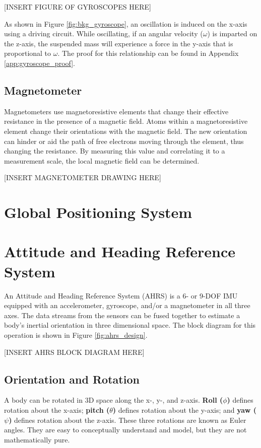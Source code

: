 [INSERT FIGURE OF GYROSCOPES HERE]

As shown in Figure \ref{fig:bkg_gyroscope}, an oscillation is induced on the x-axis using a driving circuit.
While oscillating, if an angular velocity ($\omega$) is imparted on the z-axis, the suspended mass will experience a force in the y-axis that is proportional to $\omega$.
The proof for this relationship can be found in Appendix \ref{app:gyroscope_proof}.

\subsection{Magnetometer} \label{ssec:bkg_magnetometer}
Magnetometers use magnetoresistive elements that change their effective resistance in the presence of a magnetic field.
Atoms within a magnetoresistive element change their orientations with the magnetic field.
The new orientation can hinder or aid the path of free electrons moving through the element, thus changing the resistance.
By measuring this value and correlating it to a measurement scale, the local magnetic field can be determined.

[INSERT MAGNETOMETER DRAWING HERE]

\section{Global Positioning System} \label{sec:bkg_gps}

\section{Attitude and Heading Reference System} \label{sec:bkg_ahrs}
An Attitude and Heading Reference System (AHRS) is a 6- or 9-DOF IMU equipped with an accelerometer, gyroscope, and/or a magnetometer in all three axes.
The data streams from the sensors can be fused together to estimate a body's inertial orientation in three dimensional space.
The block diagram for this operation is shown in Figure \ref{fig:ahrs_design}.

[INSERT AHRS BLOCK DIAGRAM HERE]

\subsection{Orientation and Rotation} \label{ssec:bkg_orientation}
A body can be rotated in 3D space along the x-, y-, and z-axis.
\textbf{Roll ($\phi$)} defines rotation about the x-axis; \textbf{pitch ($\theta$)} defines rotation about the y-axis; and \textbf{yaw ($\psi$)} defines rotation about the z-axis.
These three rotations are known as Euler angles.
They are easy to conceptually understand and model, but they are not mathematically pure.


